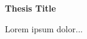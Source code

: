 \thispagestyle{plain}
\begin{center}

    \vspace{1cm}
    \Large
    \textbf{Thesis Title}
        
    \vspace{2cm}
\end{center}
Lorem ipsum dolor...